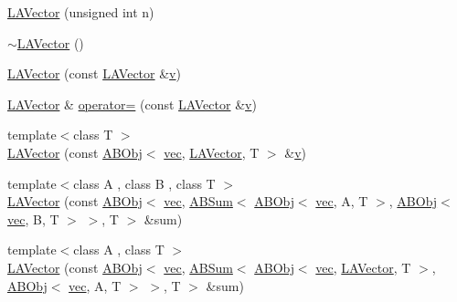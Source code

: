 \begin{DoxyCompactItemize}
\item 
\mbox{\hyperlink{classROOT_1_1Minuit2_1_1LAVector_a3dca313e27f716415056d248bd05cf1f}{L\+A\+Vector}} (unsigned int n)
\item 
\mbox{\hyperlink{classROOT_1_1Minuit2_1_1LAVector_a72c44338e1a37837e9546bfd674c22cb}{$\sim$\+L\+A\+Vector}} ()
\item 
\mbox{\hyperlink{classROOT_1_1Minuit2_1_1LAVector_ad568d638899b4fc3631c3d0a1d76f1cd}{L\+A\+Vector}} (const \mbox{\hyperlink{classROOT_1_1Minuit2_1_1LAVector}{L\+A\+Vector}} \&\mbox{\hyperlink{hadron__timeslice_8cc_a716fc87f5e814be3ceee2405ed6ff22a}{v}})
\item 
\mbox{\hyperlink{classROOT_1_1Minuit2_1_1LAVector}{L\+A\+Vector}} \& \mbox{\hyperlink{classROOT_1_1Minuit2_1_1LAVector_ad38b5ed9fc32389cb68034cde125b203}{operator=}} (const \mbox{\hyperlink{classROOT_1_1Minuit2_1_1LAVector}{L\+A\+Vector}} \&\mbox{\hyperlink{hadron__timeslice_8cc_a716fc87f5e814be3ceee2405ed6ff22a}{v}})
\item 
{\footnotesize template$<$class T $>$ }\\\mbox{\hyperlink{classROOT_1_1Minuit2_1_1LAVector_ac38d854f7a156fc61cabce29416f36cc}{L\+A\+Vector}} (const \mbox{\hyperlink{classROOT_1_1Minuit2_1_1ABObj}{A\+B\+Obj}}$<$ \mbox{\hyperlink{classROOT_1_1Minuit2_1_1vec}{vec}}, \mbox{\hyperlink{classROOT_1_1Minuit2_1_1LAVector}{L\+A\+Vector}}, T $>$ \&\mbox{\hyperlink{hadron__timeslice_8cc_a716fc87f5e814be3ceee2405ed6ff22a}{v}})
\item 
{\footnotesize template$<$class A , class B , class T $>$ }\\\mbox{\hyperlink{classROOT_1_1Minuit2_1_1LAVector_a67f11f13d8b0880924b95b6e90c0005a}{L\+A\+Vector}} (const \mbox{\hyperlink{classROOT_1_1Minuit2_1_1ABObj}{A\+B\+Obj}}$<$ \mbox{\hyperlink{classROOT_1_1Minuit2_1_1vec}{vec}}, \mbox{\hyperlink{classROOT_1_1Minuit2_1_1ABSum}{A\+B\+Sum}}$<$ \mbox{\hyperlink{classROOT_1_1Minuit2_1_1ABObj}{A\+B\+Obj}}$<$ \mbox{\hyperlink{classROOT_1_1Minuit2_1_1vec}{vec}}, A, T $>$, \mbox{\hyperlink{classROOT_1_1Minuit2_1_1ABObj}{A\+B\+Obj}}$<$ \mbox{\hyperlink{classROOT_1_1Minuit2_1_1vec}{vec}}, B, T $>$ $>$, T $>$ \&sum)
\item 
{\footnotesize template$<$class A , class T $>$ }\\\mbox{\hyperlink{classROOT_1_1Minuit2_1_1LAVector_a954c19ce9b70651d06203ca76e59b0da}{L\+A\+Vector}} (const \mbox{\hyperlink{classROOT_1_1Minuit2_1_1ABObj}{A\+B\+Obj}}$<$ \mbox{\hyperlink{classROOT_1_1Minuit2_1_1vec}{vec}}, \mbox{\hyperlink{classROOT_1_1Minuit2_1_1ABSum}{A\+B\+Sum}}$<$ \mbox{\hyperlink{classROOT_1_1Minuit2_1_1ABObj}{A\+B\+Obj}}$<$ \mbox{\hyperlink{classROOT_1_1Minuit2_1_1vec}{vec}}, \mbox{\hyperlink{classROOT_1_1Minuit2_1_1LAVector}{L\+A\+Vector}}, T $>$, \mbox{\hyperlink{classROOT_1_1Minuit2_1_1ABObj}{A\+B\+Obj}}$<$ \mbox{\hyperlink{classROOT_1_1Minuit2_1_1vec}{vec}}, A, T $>$ $>$, T $>$ \&sum)

\end{DoxyCompactItemize}

